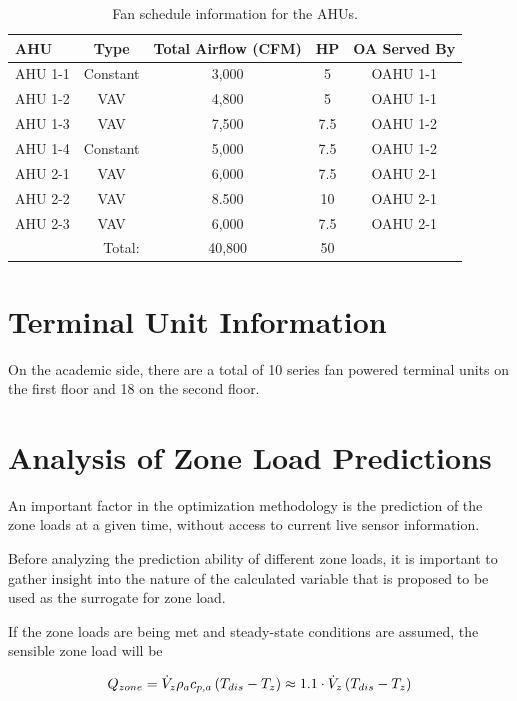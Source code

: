\begin{table}
\centering
\begin{tabular}{l c c c c}
\toprule
AHU 	& Type	 	& Total Airflow (CFM) 	& HP 	& OA Served By\\
\midrule
AHU 1-1 & Constant  & 3,000 			  	& 5 	& OAHU 1-1 \\
AHU 1-2 & VAV 		& 4,800 				& 5 	& OAHU 1-1 \\
AHU 1-3 & VAV 		& 7,500 				& 7.5 	& OAHU 1-2 \\
AHU 1-4 & Constant 	& 5,000 				& 7.5 	& OAHU 1-2 \\
AHU 2-1 & VAV 		& 6,000 				& 7.5 	& OAHU 2-1 \\
AHU 2-2 & VAV		& 8.500					& 10 	& OAHU 2-1 \\
AHU 2-3 & VAV 		& 6,000					& 7.5	& OAHU 2-1 \\
\bottomrule
\multicolumn{2}{r}{Total:} & 40,800 & 50 &  \\
\end{tabular}
\caption{Fan schedule information for the AHUs.}
\label{tab:FanSched}
\end{table}

\section{Terminal Unit Information}

On the academic side, there are a total of 10 series fan powered terminal units on the first floor and 18 on the second floor. 


\section{Analysis of Zone Load Predictions}

An important factor in the optimization methodology is the prediction of the zone loads at a given time, without access to current live sensor information. 

Before analyzing the prediction ability of different zone loads, it is important to gather insight into the nature of the calculated variable that is proposed to be used as the surrogate for zone load.   

If the zone loads are being met and steady-state conditions are assumed, the sensible zone load will be

\begin{equation}
    Q_{zone}=\dot{V}_{z} \rho_a c_{p,a}{} \left(T_{dis}-T_{z} \right) \approx 1.1 \cdot \dot{V}_{z}\left(T_{dis}-T_{z} \right)
\end{equation}


